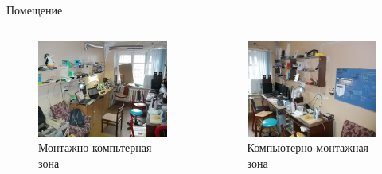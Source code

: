 \documentclass[presentation]{beamer}
\begin{document}
\begin{frame}[label=sec-2-1-2]{Помещение}
  \begin{columns}
    \begin{column}{0.5\textwidth}
      \begin{figure}
        \includegraphics[width=\linewidth]{cadr-room-1.jpg}
        \caption{Монтажно-компьтерная зона}
      \end{figure}
    \end{column}
    \begin{column}{0.5\textwidth}
      \begin{figure}
        \includegraphics[width=\linewidth]{cadr-room-2.jpg}
        \caption{Компьютерно-монтажная зона}
      \end{figure}
    \end{column}
  \end{columns}
\end{frame}
\end{document}
